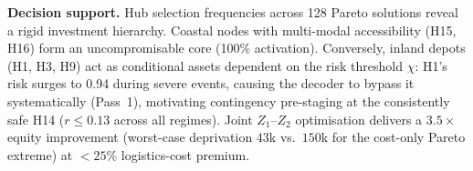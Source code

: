 \documentclass{llncs}
\begin{document}

\textbf{Decision support.} Hub selection frequencies across 128 Pareto solutions reveal a rigid investment hierarchy. Coastal nodes with multi-modal accessibility (H15, H16) form an uncompromisable core (100\% activation). Conversely, inland depots (H1, H3, H9) act as conditional assets dependent on the risk threshold $\chi$: H1's risk surges to 0.94 during severe events, causing the decoder to bypass it systematically (Pass~1), motivating contingency pre-staging at the consistently safe H14 ($r{\le}0.13$ across all regimes). Joint $Z_1$--$Z_2$ optimisation delivers a $3.5\times$ equity improvement (worst-case deprivation $43$k vs.\ $150$k for the cost-only Pareto extreme) at $<25\%$ logistics-cost premium.
\end{document}
